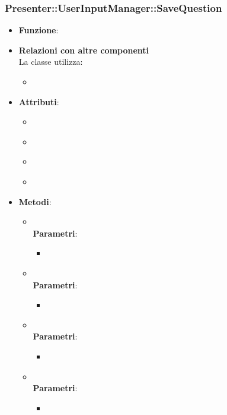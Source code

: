 \subsubsection{Presenter::UserInputManager::SaveQuestion}
\begin{itemize}
\item\textbf{Funzione}:
\item\textbf{Relazioni con altre componenti}\\
La classe utilizza:
	\begin{itemize}
		\item
	\end{itemize}
\item\textbf{Attributi}:
	\begin{itemize}
		\item\code{}\\
		\item\code{}\\
		\item\code{}\\
		\item\code{}\\
	\end{itemize}
\item\textbf{Metodi}:
	\begin{itemize}
		\item\code{}\\
		\textbf{Parametri}:
			\begin{itemize}
				\item\code{}\\
			\end{itemize}
		\item\code{}\\
		\textbf{Parametri}:
			\begin{itemize}
				\item\code{}\\
			\end{itemize}
		\item\code{}\\
		\textbf{Parametri}:
			\begin{itemize}
				\item\code{}\\
			\end{itemize}
		\item\code{}\\
		\textbf{Parametri}:
			\begin{itemize}
				\item\code{}\\
			\end{itemize}
	\end{itemize}
\end{itemize}

